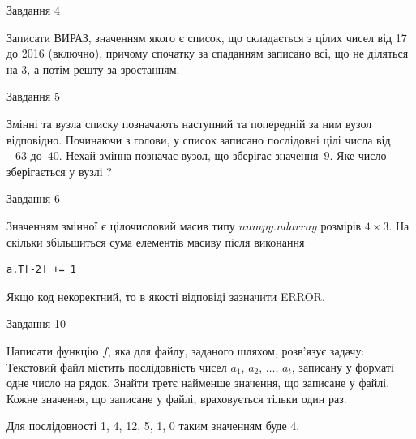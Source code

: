 \documentclass[12pt, ukrainian]{article}
\begin{document}
{\begin{minipage}[t]{8.0cm}
\end{minipage}


               
{\begin{center}Завдання {4}\end{center}}
\vspace{-4mm}

Записати ВИРАЗ, значенням якого є список, що складається з цілих чисел від 17 до 2016 (включно), причому спочатку за спаданням записано всі, що не діляться на 3, а потім решту за зростанням.\par

\vspace{10mm}
               
{\begin{center}Завдання {5}\end{center}}
\vspace{-4mm}
Змінні  та  вузла списку позначають наступний та попередній за ним вузол відповідно. Починаючи з голови, у список записано послідовні цілі числа від~$-63$ до~$40$. Нехай змінна  позначає вузол, що зберігає значення~$9$.
Яке число зберігається у вузлі  ?\par

               
{\begin{center}Завдання {6}\end{center}}
\vspace{-4mm}
Значенням змінної  є цілочисловий масив типу $numpy.ndarray$ розмірів $4{\times}3$. На скільки збільшиться сума елементів масиву  після виконання
\begin{verbatim}
a.T[-2] += 1
\end{verbatim}


Якщо код некоректний, то в якості відповіді зазначити ERROR.\par

               
{\begin{center}Завдання {10}\end{center}}
\vspace{-4mm}

Написати функцію $f$, яка для файлу, заданого шляхом, розв’язує задачу:\\ Текстовий файл містить послідовність чисел $a_1$, $a_2$, $\ldots$, $a_t$, записану у форматі одне число на рядок. Знайти третє найменше значення, що записане у файлі. Кожне значення, що записане у файлі, враховується тільки один раз. \par
Для послідовності 1, 4, 12, 5, 1, 0 таким значенням буде 4.

}
\end{document}
